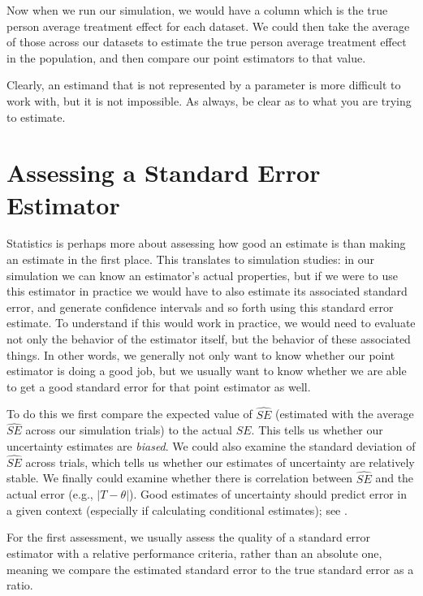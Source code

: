 \documentclass[
]{book}
\begin{document}
Now when we run our simulation, we would have a column which is the true person average treatment effect for each dataset.
We could then take the average of those across our datasets to estimate the true person average treatment effect in the population, and then compare our point estimators to that value.

Clearly, an estimand that is not represented by a parameter is more difficult to work with, but it is not impossible.
As always, be clear as to what you are trying to estimate.

\section{Assessing a Standard Error Estimator}\label{assessing-a-standard-error-estimator}

Statistics is perhaps more about assessing how good an estimate is than making an estimate in the first place.
This translates to simulation studies: in our simulation we can know an estimator's actual properties, but if we were to use this estimator in practice we would have to also estimate its associated standard error, and generate confidence intervals and so forth using this standard error estimate.
To understand if this would work in practice, we would need to evaluate not only the behavior of the estimator itself, but the behavior of these associated things.
In other words, we generally not only want to know whether our point estimator is doing a good job, but we usually want to know whether we are able to get a good standard error for that point estimator as well.

To do this we first compare the expected value of \(\widehat{SE}\) (estimated with the average \(\widehat{SE}\) across our simulation trials) to the actual \(SE\).
This tells us whether our uncertainty estimates are \emph{biased}.
We could also examine the standard deviation of \(\widehat{SE}\) across trials, which tells us whether our estimates of uncertainty are relatively stable.
We finally could examine whether there is correlation between \(\widehat{SE}\) and the actual error (e.g., \(\left|T - \theta \right|\)).
Good estimates of uncertainty should predict error in a given context (especially if calculating conditional estimates); see \citet{sundberg2003conditional}.

For the first assessment, we usually assess the quality of a standard error estimator with a relative performance criteria, rather than an absolute one, meaning we compare the estimated standard error to the true standard error as a ratio.
\end{document}
